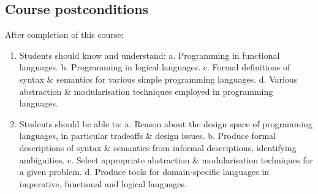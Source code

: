 \documentclass[11pt]{article}
\theoremstyle{definition}
\begin{document}
\subsection{Course postconditions}
\label{sec:org55bc488}
After completion of this course:

\begin{enumerate}
\item Students should know and understand:
a. Programming in functional languages.
b. Programming in logical languages.
c. Formal definitions of syntax \& semantics for various
   simple programming languages.
d. Various abstraction \& modularisation techniques
   employed in programming languages.
\item Students should be able to:
a. Reason about the design space of programming languages,
   in particular tradeoffs \& design issues.
b. Produce formal descriptions of syntax \& semantics
   from informal descriptions, identifying ambiguities.
c. Select appropriate abstraction \& modularisation techniques
   for a given problem.
d. Produce tools for domain-specific languages
   in imperative, functional and logical languages.
\end{enumerate}
\end{document}
